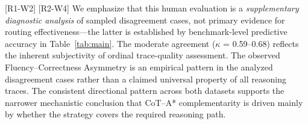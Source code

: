 \documentclass[11pt]{article}
\begin{document}
\textcolor{reviewergreen}{[R1-W2]} \textcolor{reviewerblue}{[R2-W4]} \textcolor{reviewergreen}{We emphasize that this human evaluation is a \emph{supplementary diagnostic analysis} of sampled disagreement cases, not primary evidence for routing effectiveness---the latter is established by benchmark-level predictive accuracy in Table~\ref{tab:main}. The moderate agreement ($\kappa$ = 0.59--0.68) reflects the inherent subjectivity of ordinal trace-quality assessment. The observed Fluency--Correctness Asymmetry is an empirical pattern in the analyzed disagreement cases rather than a claimed universal property of all reasoning traces. The consistent directional pattern across both datasets supports the narrower mechanistic conclusion that CoT--A* complementarity is driven mainly by whether the strategy covers the required reasoning path.}






\end{document}
